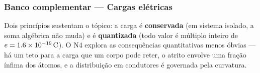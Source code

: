
\subsubsection*{Banco complementar --- Cargas elétricas}

\begin{atencao}
Dois princípios sustentam o tópico: a carga é \textbf{conservada} (em sistema
isolado, a soma algébrica não muda) e é \textbf{quantizada} (todo valor é
múltiplo inteiro de $e=1.6\times 10^{-19}\,\si{\coulomb}$). O N4 explora as
consequências quantitativas menos óbvias --- há um teto para a carga que um
corpo pode reter, o atrito envolve uma fração ínfima dos átomos, e a
distribuição em condutores é governada pela curvatura.
\end{atencao}

\blocoaprofundamento

